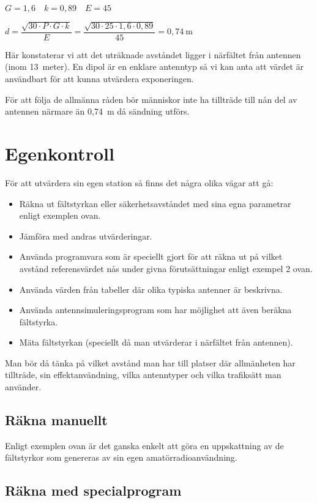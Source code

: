 \(G = 1,6 \quad k = 0,89 \quad E = 45\)

\(d = \dfrac{\sqrt{30 \cdot P \cdot G \cdot k}}{E} = \dfrac{\sqrt{30 \cdot 25 \cdot 1,6 \cdot 0,89}}{45}
= 0,74\ \mathrm{m}\)

Här konstaterar vi att det uträknade avståndet ligger i närfältet från antennen
(inom 13~meter).
En dipol är en enklare antenntyp så vi kan anta att värdet är användbart för att
kunna utvärdera exponeringen.

För att följa de allmänna råden bör människor inte ha tillträde till
nån del av antennen närmare än 0,74~m då sändning utförs.

\section{Egenkontroll}

För att utvärdera sin egen station så finns det några olika vägar att gå:

\begin{itemize}
	\item Räkna ut fältstyrkan eller säkerhetsavståndet med sina egna
	parametrar enligt exemplen ovan.
	\item Jämföra med andras utvärderingar.
	\item Använda programvara som är speciellt gjort för att räkna ut på
	vilket avstånd referensvärdet nås under givna förutsättningar enligt
	exempel 2 ovan.
	\item Använda värden från tabeller där olika typiska antenner är beskrivna.
	\item Använda antennsimuleringsprogram som har möjlighet att även
	beräkna fältstyrka.
	\item Mäta fältstyrkan (speciellt då man utvärderar i närfältet från
	antennen).
\end{itemize}

Man bör då tänka på vilket avstånd man har till platser där allmänheten har
tillträde, sin effektanvändning, vilka antenntyper och vilka trafiksätt man
använder.

\subsection{Räkna manuellt}

Enligt exemplen ovan är det ganska enkelt att göra en uppskattning av
de fältstyrkor som genereras av sin egen amatörradioanvändning.

\subsection{Räkna med specialprogram}

